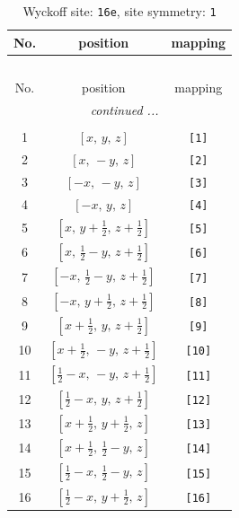 \documentclass[fleqn,8pt]{jsarticle}
\begin{document}
\begin{longtable}{ccc}
\caption{Wyckoff site: {\tt 16e}, site symmetry: {\tt 1}}
 \\
 \hline \hline
No. & position & mapping \\ \hline \endfirsthead

\multicolumn{2}{l}{\tablename\ \thetable{}} \\
 \hline \hline
No. & position & mapping \\ \hline \endhead

 \hline \hline
\multicolumn{2}{r}{\footnotesize\it continued ...} \\ \endfoot

 \hline \hline
\multicolumn{2}{r}{} \\ \endlastfoot

1 & $\left[ x,\, y,\, z \right]$ & {\tt [1]} \\ \hline
2 & $\left[ x,\, - y,\, z \right]$ & {\tt [2]} \\ \hline
3 & $\left[ - x,\, - y,\, z \right]$ & {\tt [3]} \\ \hline
4 & $\left[ - x,\, y,\, z \right]$ & {\tt [4]} \\ \hline
5 & $\left[ x,\, y + \frac{1}{2},\, z + \frac{1}{2} \right]$ & {\tt [5]} \\ \hline
6 & $\left[ x,\, \frac{1}{2} - y,\, z + \frac{1}{2} \right]$ & {\tt [6]} \\ \hline
7 & $\left[ - x,\, \frac{1}{2} - y,\, z + \frac{1}{2} \right]$ & {\tt [7]} \\ \hline
8 & $\left[ - x,\, y + \frac{1}{2},\, z + \frac{1}{2} \right]$ & {\tt [8]} \\ \hline
9 & $\left[ x + \frac{1}{2},\, y,\, z + \frac{1}{2} \right]$ & {\tt [9]} \\ \hline
10 & $\left[ x + \frac{1}{2},\, - y,\, z + \frac{1}{2} \right]$ & {\tt [10]} \\ \hline
11 & $\left[ \frac{1}{2} - x,\, - y,\, z + \frac{1}{2} \right]$ & {\tt [11]} \\ \hline
12 & $\left[ \frac{1}{2} - x,\, y,\, z + \frac{1}{2} \right]$ & {\tt [12]} \\ \hline
13 & $\left[ x + \frac{1}{2},\, y + \frac{1}{2},\, z \right]$ & {\tt [13]} \\ \hline
14 & $\left[ x + \frac{1}{2},\, \frac{1}{2} - y,\, z \right]$ & {\tt [14]} \\ \hline
15 & $\left[ \frac{1}{2} - x,\, \frac{1}{2} - y,\, z \right]$ & {\tt [15]} \\ \hline
16 & $\left[ \frac{1}{2} - x,\, y + \frac{1}{2},\, z \right]$ & {\tt [16]} \\
\end{longtable}
\end{document}
